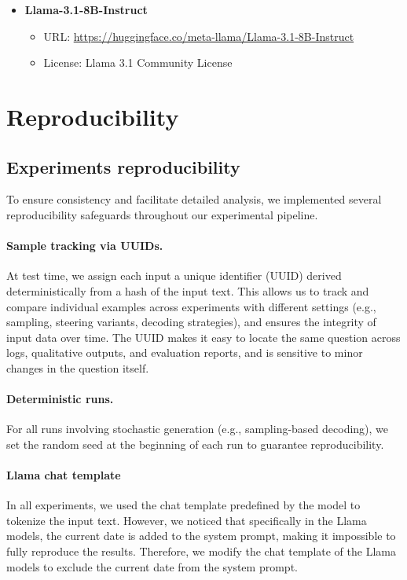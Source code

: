 \documentclass{article} %
\begin{document}
\begin{itemize}
    \item \textbf{Llama-3.1-8B-Instruct}  
    \begin{itemize}
        \item URL: \url{https://huggingface.co/meta-llama/Llama-3.1-8B-Instruct}
        \item License: Llama 3.1 Community License
    \end{itemize}

\end{itemize}

\section{Reproducibility} \label{app:reproducibility}

\subsection{Experiments reproducibility}
To ensure consistency and facilitate detailed analysis, we implemented several reproducibility safeguards throughout our experimental pipeline.

\paragraph{Sample tracking via UUIDs.}  
At test time, we assign each input a unique identifier (UUID) derived deterministically from a hash of the input text. This allows us to track and compare individual examples across experiments with different settings (e.g., sampling, steering variants, decoding strategies), and ensures the integrity of input data over time. The UUID makes it easy to locate the same question across logs, qualitative outputs, and evaluation reports, and is sensitive to minor changes in the question itself.

\paragraph{Deterministic runs.}  
For all runs involving stochastic generation (e.g., sampling-based decoding), we set the random seed at the beginning of each run to guarantee reproducibility.


\paragraph{Llama chat template}
In all experiments, we used the chat template predefined by the model to tokenize the input text. However, we noticed that specifically in the Llama models, the current date is added to the system prompt, making it impossible to fully reproduce the results. Therefore, we modify the chat template of the Llama models to exclude the current date from the system prompt.
\end{document}
